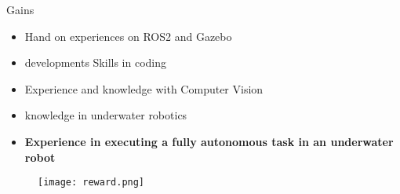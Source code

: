 \begin{frame}[t]{Gains}
    \begin{itemize}
        \item Hand on experiences on ROS2 and Gazebo
        \item developments Skills in coding
        \item Experience and knowledge with Computer Vision
        \item knowledge in underwater robotics
            \item \textbf{Experience in executing a fully autonomous task in an underwater robot}
    \end{itemize}
    \begin{center}
        \begin{figure}
            \texttt{[image: reward.png]}               
           
        \end{figure}
    
        \end{center}

    
   
\end{frame}


\begin{frame}{}
    \transdissolve[duration=0.5]
   
    \begin{center}
    \end{center}
\end{frame}






    
   
